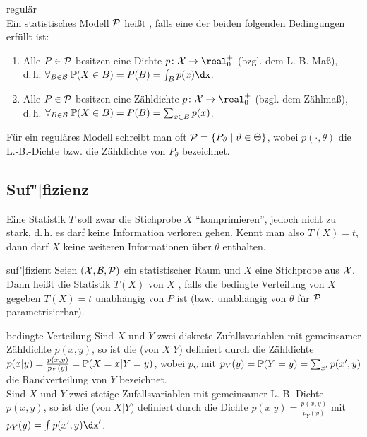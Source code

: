 \begin{Def}{regulär}\\
    Ein statistisches Modell $\P$ heißt , falls eine der beiden folgenden
    Bedingungen erfüllt ist:
    \begin{enumerate}
        \item
        Alle $P \in \P$ besitzen eine Dichte $p\colon \X \rightarrow \real_0^+$
        (bzgl. dem L.-B.-Maß),\\
        d.\,h. $\forall_{B \in \B}\; \PP(X \in B) = P(B) = \int_B p(x)\dx$.

        \item
        Alle $P \in \P$ besitzen eine Zähldichte $p\colon \X \rightarrow \real_0^+$
        (bzgl. dem Zählmaß),\\
        d.\,h. $\forall_{B \in \B}\; \PP(X \in B) = P(B) = \sum_{x \in B} p(x)$.
    \end{enumerate}
    Für ein reguläres Modell schreibt man oft $\P = \{P_\theta \;|\; \theta \in \Theta\}$,
    wobei $p(\cdot, \theta)$ die L.-B.-Dichte bzw. die Zähldichte von $P_\theta$ bezeichnet.
\end{Def}

\pagebreak

\subsection{%
    Suf"|fizienz%
}

\begin{Bem}
    Eine Statistik $T$ soll zwar die Stichprobe $X$ "`komprimieren"', jedoch nicht zu stark,
    d.\,h. es darf keine Information verloren gehen.
    Kennt man also $T(X) = t$, dann darf $X$ keine weiteren Informationen über $\theta$ enthalten.
\end{Bem}

\begin{Def}{suf"|fizient}
    Seien $(\X, \B, \P)$ ein statistischer Raum und $X$ eine Stichprobe aus $\X$.\\
    Dann heißt die Statistik $T(X)$ von $X$ , falls
    die bedingte Verteilung von $X$ gegeben $T(X) = t$ unabhängig von $P$ ist
    (bzw. unabhängig von $\theta$ für $\P$ parametrisierbar).
\end{Def}

\begin{Def}{bedingte Verteilung}
    Sind $X$ und $Y$ zwei diskrete Zufallsvariablen mit gemeinsamer Zähldichte $p(x, y)$,
    so ist die  (von $X|Y$) definiert durch
    die Zähldichte $p(x|y) = \frac{p(x, y)}{p_Y(y)} = \PP(X = x|Y = y)$,
    wobei $p_Y$ mit $p_Y(y) = \PP(Y = y) = \sum_{x'} p(x', y)$ die Randverteilung von $Y$
    bezeichnet.\\
    Sind $X$ und $Y$ zwei stetige Zufallsvariablen mit gemeinsamer L.-B.-Dichte $p(x, y)$,
    so ist die  (von $X|Y$) definiert durch
    die Dichte $p(x|y) = \frac{p(x, y)}{p_Y(y)}$ mit $p_Y(y) = \int p(x', y)\dx'$.
\end{Def}

